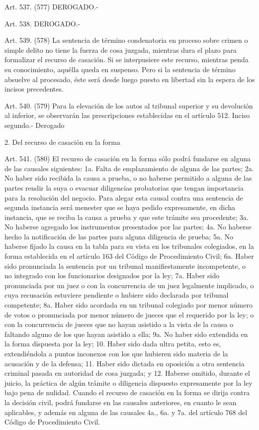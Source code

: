     Art. 537. (577) DEROGADO.-


    Art. 538. DEROGADO.-


    Art. 539. (578) La sentencia de término condenatoria en proceso sobre crimen o simple delito no tiene la fuerza de cosa juzgada, mientras dura el plazo para formalizar el recurso de casación.
    Si se interpusiere este recurso, mientras penda su conocimiento, aquélla queda en suspenso.
    Pero si la sentencia de término absuelve al procesado, éste será desde luego puesto en libertad sin la espera de los incisos precedentes.


    Art. 540. (579) Para la elevación de los autos al tribunal superior y su devolución al inferior, se observarán las prescripciones establecidas en el artículo 512.
    Inciso segundo.- Derogado

    2. Del recurso de casación en la forma

    Art. 541. (580) El recurso de casación en la forma sólo podrá fundarse en alguna de las causales siguientes:
    1a. Falta de emplazamiento de alguna de las partes;
    2a. No haber sido recibida la causa a prueba, o no haberse permitido a alguna de las partes rendir la suya o evacuar diligencias probatorias que tengan importancia para la resolución del negocio. Para alegar esta causal contra una sentencia de segunda instancia será menester que se haya pedido expresamente, en dicha instancia, que se reciba la causa a prueba y que este trámite sea procedente;
    3a. No haberse agregado los instrumentos presentados por las partes;
    4a. No haberse hecho la notificación de las partes para alguna diligencia de prueba;
    5a. No haberse fijado la causa en la tabla para su vista en los tribunales colegiados, en la forma establecida en el artículo 163 del Código de Procedimiento Civil;
    6a. Haber sido pronunciada la sentencia por un tribunal manifiestamente incompetente, o no integrado con los funcionarios designados por la ley;
    7a. Haber sido pronunciada por un juez o con la concurrencia de un juez legalmente implicado, o cuya recusación estuviere pendiente o hubiere sido declarada por tribunal competente;
    8a. Haber sido acordada en un tribunal colegiado por menor número de votos o pronunciada por menor número de jueces que el requerido por la ley; o con la concurrencia de jueces que no hayan asistido a la vista de la causa o faltando alguno de los que hayan asistido a ella;
    9a. No haber sido extendida en la forma dispuesta por la ley;
    10. Haber sido dada ultra petita, esto es, extendiéndola a puntos inconexos con los que hubieren sido materia de la acusación y de la defensa;
    11. Haber sido dictada en oposición a otra sentencia criminal pasada en autoridad de cosa juzgada; y
    12. Haberse omitido, durante el juicio, la práctica de algún trámite o diligencia dispuesto expresamente por la ley bajo pena de nulidad.
    Cuando el recurso de casación en la forma se dirija contra la decisión civil, podrá fundarse en las causales anteriores, en cuanto le sean aplicables, y además en alguna de las causales 4a., 6a. y 7a. del artículo 768 del Código de Procedimiento Civil.

